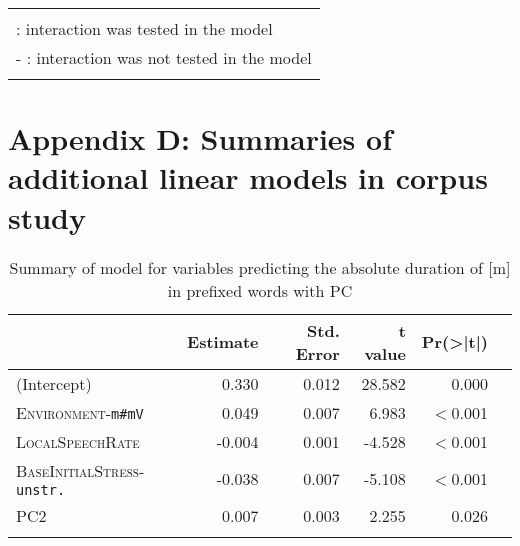 \begin{table}
{\begin{tabular}{lrrrrr}
		\midrule\\
						\multicolumn{6}{l}{\small \checkmark \hspace*{0.2cm}: interaction was tested in the model} \\			
						\multicolumn{6}{l}{\small - \hspace*{0.45cm}: interaction was not tested in the model} \\			
		
			\lspbottomrule 
			\end{tabular}
}

\end{table}



\clearpage

\section*{Appendix D: Summaries of additional linear models in corpus study}\label{Appendix D: model summaries corpus}


\begin{table}
	
	\caption{ Summary of model for variables predicting the absolute duration of [m] in prefixed words with PC}
	\label{model im PC Corpus abs}

	\begin{tabular}{lrrrrr}
				\lsptoprule
		& Estimate                       & Std. Error            & t value & Pr(\textgreater|t|)  \\ \midrule
(Intercept) & 0.330 & 0.012 & 28.582 & 0.000 \\ 
\textsc{Environment}-\texttt{m\#mV}& 0.049 & 0.007 & 6.983 & $<$0.001\\ 
\textsc{LocalSpeechRate }& -0.004 & 0.001 & -4.528 & $<$0.001\\ 
\textsc{BaseInitialStress}-\texttt{unstr.} & -0.038 & 0.007 & -5.108 &  $<$0.001 \\ 
\textsc{PC2 }& 0.007 & 0.003 & 2.255 & 0.026 \\
		\lspbottomrule 
			\end{tabular}
\end{table}



